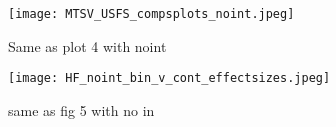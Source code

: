 \documentclass{article}
\begin{document}
    \begin{figure}
    \centering
    \texttt{[image: MTSV\_USFS\_compsplots\_noint.jpeg]} 
    \caption{Same as plot 4 with noint}
    \label{fig:Figure 6}
    \end{figure}
    
        \begin{figure}
    \centering
    \texttt{[image: HF\_noint\_bin\_v\_cont\_effectsizes.jpeg]}
    \caption{same as fig 5 with no in}
    \label{fig:Figure 7}
    \end{figure}
\end{document}
